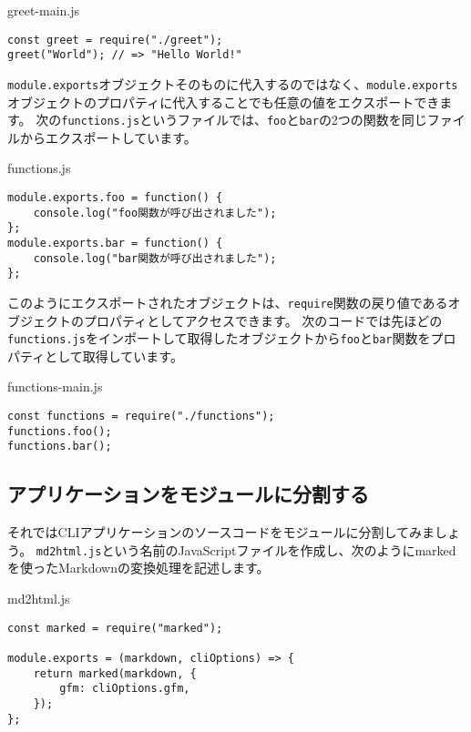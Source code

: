 \begin{listtitle}
greet-main.js
\end{listtitle}
\begin{lstlisting}
const greet = require("./greet");
greet("World"); // => "Hello World!"
\end{lstlisting}
\listend

\texttt{module.exports}オブジェクトそのものに代入するのではなく、\texttt{module.exports}オブジェクトのプロパティに代入することでも任意の値をエクスポートできます。
次の\texttt{functions.js}というファイルでは、\texttt{foo}と\texttt{bar}の2つの関数を同じファイルからエクスポートしています。

\begin{listtitle}
functions.js
\end{listtitle}
\begin{lstlisting}
module.exports.foo = function() {
    console.log("foo関数が呼び出されました");
};
module.exports.bar = function() {
    console.log("bar関数が呼び出されました");
};
\end{lstlisting}
\listend

このようにエクスポートされたオブジェクトは、\texttt{require}関数の戻り値であるオブジェクトのプロパティとしてアクセスできます。
次のコードでは先ほどの\texttt{functions.js}をインポートして取得したオブジェクトから\texttt{foo}と\texttt{bar}関数をプロパティとして取得しています。

\begin{listtitle}
functions-main.js
\end{listtitle}
\begin{lstlisting}
const functions = require("./functions");
functions.foo();
functions.bar();
\end{lstlisting}
\listend

\hypertarget{split-script}{%
\subsection{アプリケーションをモジュールに分割する}\label{split-script}}

それではCLIアプリケーションのソースコードをモジュールに分割してみましょう。
\texttt{md2html.js}という名前のJavaScriptファイルを作成し、次のようにmarkedを使ったMarkdownの変換処理を記述します。

\begin{listtitle}
md2html.js
\end{listtitle}
\begin{lstlisting}
const marked = require("marked");

module.exports = (markdown, cliOptions) => {
    return marked(markdown, {
        gfm: cliOptions.gfm,
    });
};
\end{lstlisting}
\listend

